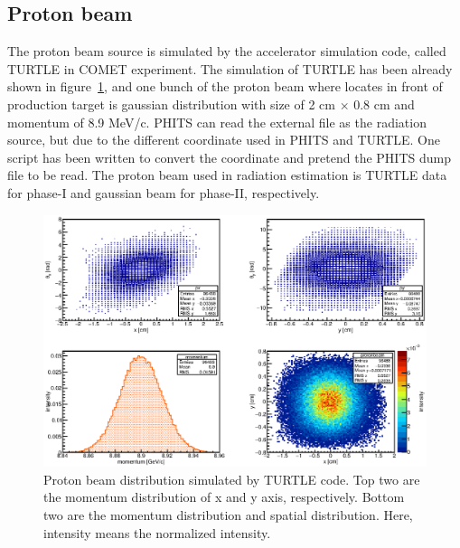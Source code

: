  \subsection{Proton beam}
The proton beam source is simulated by the accelerator simulation code, called TURTLE in COMET experiment.
The simulation of TURTLE has been already shown in figure~\ref{beam}, and one bunch of the proton beam where locates in front of production target is gaussian distribution with size of 2 cm $\times$ 0.8 cm and momentum of 8.9 MeV/c.
PHITS can read the external file as the radiation source, but due to the different coordinate used in PHITS and TURTLE.
One script has been written to convert the coordinate and pretend the PHITS dump file to be read. 
The proton beam used in radiation estimation is TURTLE data for phase-I and gaussian beam for phase-II, respectively.
\begin{figure}[H]
 \centering
 \includegraphics[scale=0.6]{chapter3/fig/beam.eps}
 \caption{Proton beam distribution simulated by TURTLE code. Top two are the momentum distribution of x and y axis, respectively. Bottom two are the momentum distribution and spatial distribution. Here, intensity means the normalized intensity.}
 \label{beam}
\end{figure}
 
